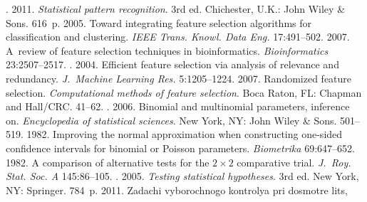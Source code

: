 

\vspace*{-9pt}





  \begin{multicols}{2}

\renewcommand{\bibname}{\protect\rmfamily References}

{\small\frenchspacing
 {%
 \begin{thebibliography}{99}
. 2011. \textit{Statistical pattern recognition}. 
3rd ed. Chichester, U.K.: John Wiley \& Sons. 616~p.
 2005. Toward integrating feature selection algorithms for 
classification and clustering. \textit{IEEE Trans. Knowl.  Data Eng.}  
17:491--502.
 2007. A~review of feature selection 
techniques in bioinformatics. \textit{Bioinformatics} 23:2507--2517.
. 2004. Efficient feature selection via analysis of relevance 
and redundancy. \textit{J.~Machine Learning Res.} 5:1205--1224.
 2007. Randomized feature selection. \textit{Computational 
methods of feature selection}. Boca Raton, FL: Chapman and Hall/CRC.  
41--62.
. 2006. Binomial and multinomial parameters, 
inference on. \textit{Encyclopedia of statistical sciences}. New York, NY: John 
Wiley \& Sons. 501--519.
 1982. Improving the normal approximation when constructing 
one-sided confidence intervals for binomial or Poisson parameters. \textit{Biometrika} 
69:647--652.
 1982. A comparison of alternative tests for the $2\times2$ 
comparative trial. \textit{J.~Roy. Stat. Soc. A} 145:86--105.
. 2005. \textit{Testing statistical 
hypotheses}. 3rd ed. New York, NY: Springer. 784~p.
 2011. Zadachi vyborochnogo kontrolya pri dosmotre lits, 

\end{thebibliography}}}
\end{multicols}
